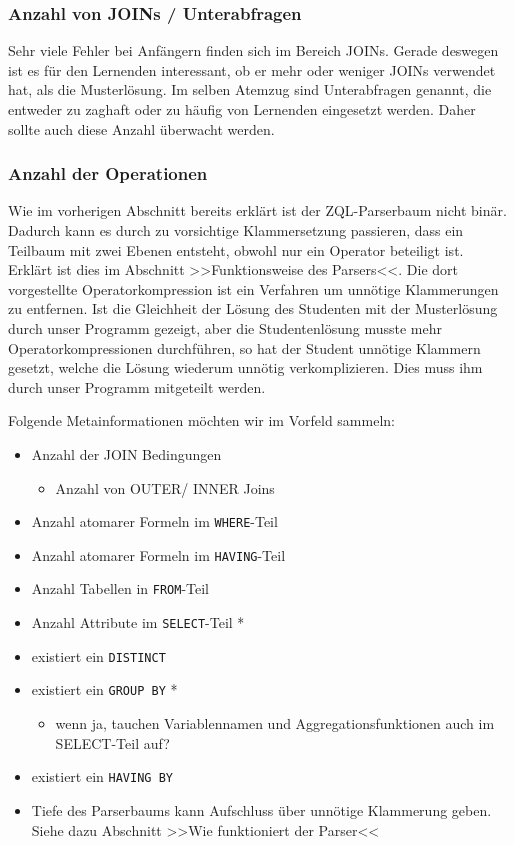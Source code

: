 \subsubsection*{Anzahl von JOINs / Unterabfragen}

Sehr viele Fehler bei Anfängern finden sich im Bereich JOINs. Gerade deswegen ist es für den Lernenden interessant, ob er mehr oder weniger JOINs verwendet hat, als die Musterlösung. Im selben Atemzug sind Unterabfragen genannt, die entweder zu zaghaft oder zu häufig von Lernenden eingesetzt werden. Daher sollte auch diese Anzahl überwacht werden.

\subsubsection*{Anzahl der Operationen}

Wie im vorherigen Abschnitt bereits erklärt ist der ZQL-Parserbaum nicht binär. Dadurch kann es durch zu vorsichtige Klammersetzung passieren, dass ein Teilbaum mit zwei Ebenen entsteht, obwohl nur ein Operator beteiligt ist. Erklärt ist dies im Abschnitt >>Funktionsweise des Parsers<<. Die dort vorgestellte Operatorkompression ist ein Verfahren um unnötige Klammerungen zu entfernen. Ist die Gleichheit der Lösung des Studenten mit der Musterlösung durch unser Programm gezeigt, aber die Studentenlösung musste mehr Operatorkompressionen durchführen, so hat der Student unnötige Klammern gesetzt, welche die Lösung wiederum unnötig verkomplizieren. Dies muss ihm durch unser Programm mitgeteilt werden.

Folgende Metainformationen möchten wir im Vorfeld sammeln:

\begin{itemize}
\item Anzahl der JOIN Bedingungen
	\begin{itemize}
	\item Anzahl von OUTER/ INNER Joins
	\end{itemize}
\item Anzahl atomarer Formeln im \verb|WHERE|-Teil
\item Anzahl atomarer Formeln im \verb|HAVING|-Teil
\item Anzahl Tabellen in \verb|FROM|-Teil
\item Anzahl Attribute im \verb|SELECT|-Teil *
\item existiert ein \verb|DISTINCT|
\item existiert ein \verb|GROUP BY| *
	\begin{itemize}
	\item wenn ja, tauchen Variablennamen und Aggregationsfunktionen auch im SELECT-Teil auf?
	\end{itemize}	 
\item existiert ein \verb|HAVING BY|
\item Tiefe des Parserbaums kann Aufschluss über unnötige Klammerung geben. Siehe dazu Abschnitt >>Wie funktioniert der Parser<<
\end{itemize}

